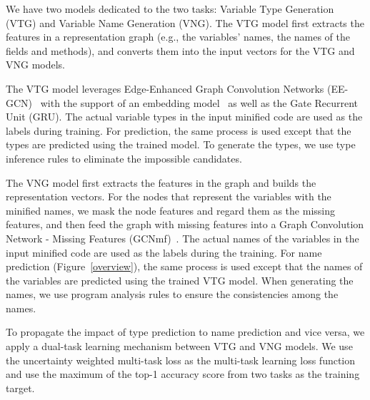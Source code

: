 We have two models dedicated to the two tasks: Variable Type
Generation (VTG) and Variable Name Generation (VNG). The VTG model
first extracts the features in a representation graph (e.g., the
variables' names, the names of the fields and methods), and converts
them into the input vectors for the VTG and VNG models.

The VTG model leverages Edge-Enhanced Graph Convolution Networks
(EE-GCN)~\cite{ee-gcn} with the support of an embedding
model~\cite{pennington2014glove} as well as the Gate Recurrent Unit
(GRU). The actual variable types in the input minified code
are used as the labels during training. For prediction, the same
process is used except that the types are predicted
using the trained model. To generate the types, we use type
inference rules to eliminate the impossible candidates.

The VNG model first extracts the features in the graph and builds the
representation vectors. For the nodes that represent the variables
with the minified names, we mask the node features and regard them as
the missing features, and then feed the graph with missing features
into a Graph Convolution Network - Missing Features
(GCNmf)~\cite{GCNmf}. The actual names
of the variables in the input minified code are used as the labels
during the training. For name prediction (Figure~\ref{overview}), the
same process is used except that the names of the variables are
predicted using the trained VTG model. When generating the names, we
use program analysis rules to ensure the consistencies among the
names.

To propagate the impact of type prediction to name prediction and vice
versa, we apply a dual-task learning mechanism between VTG and VNG
models.  We use the uncertainty weighted multi-task loss as the
multi-task learning loss function and use the maximum of the top-1
accuracy score from two tasks as the training target.






